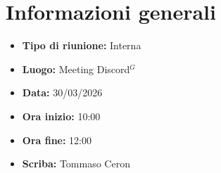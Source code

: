 \section{Informazioni generali}

\begin{itemize}
    \item \textbf{Tipo di riunione:} Interna
    \item \textbf{Luogo:} Meeting Discord$^G$
    \item \textbf{Data:} 30/03/2026
    \item \textbf{Ora inizio:} 10:00
    \item \textbf{Ora fine:} 12:00
    \item \textbf{Scriba:} Tommaso Ceron 
\end{itemize}